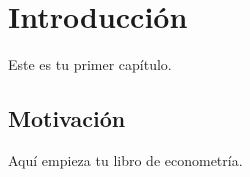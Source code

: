 \chapter{Introducción}

Este es tu primer capítulo.

\section{Motivación}

Aquí empieza tu libro de econometría.